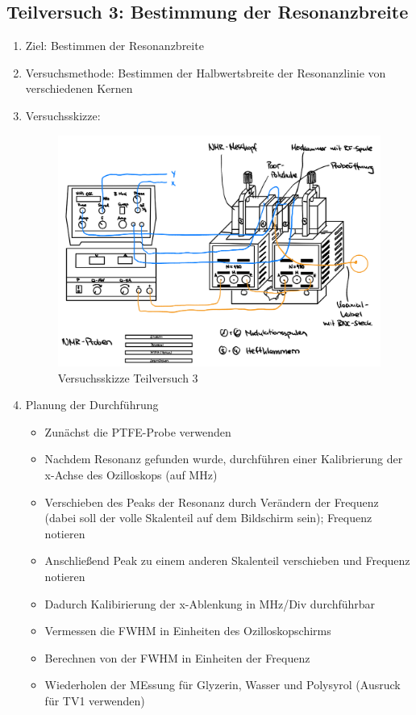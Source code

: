 \documentclass{article}
\begin{document}
\newpage

\subsection{Teilversuch 3: Bestimmung der Resonanzbreite}
\begin{enumerate}[label = (\Roman*)]
    \item Ziel: Bestimmen der Resonanzbreite
    
    \item Versuchsmethode: Bestimmen der Halbwertsbreite der Resonanzlinie von verschiedenen Kernen
    
    \item Versuchsskizze:
    
        \begin{figure}[H]
        \centering
        \includegraphics[width=0.7\linewidth]{Abbildungen/TV1-5.jpeg}
        \caption{Versuchsskizze Teilversuch 3}
        \end{figure}

    \item Planung der Durchführung
        \begin{itemize}
           \item Zunächst die PTFE-Probe verwenden
           \item Nachdem Resonanz gefunden wurde, durchführen einer Kalibrierung der x-Achse des Ozilloskops (auf MHz)
           \item Verschieben des Peaks der Resonanz durch Verändern der Frequenz (dabei soll der volle Skalenteil auf dem Bildschirm sein); Frequenz notieren
           \item Anschließend Peak zu einem anderen Skalenteil verschieben und Frequenz notieren
           \item Dadurch Kalibirierung der x-Ablenkung in MHz/Div durchführbar
           \item Vermessen die FWHM in Einheiten des Ozilloskopschirms
           \item Berechnen von der FWHM in Einheiten der Frequenz
           \item Wiederholen der MEssung für Glyzerin, Wasser und Polysyrol (Ausruck für TV1 verwenden)
        \end{itemize}


\end{enumerate}
\end{document}
